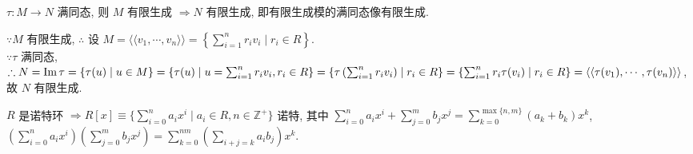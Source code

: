 \documentclass{note}
\begin{document}
\begin{cor}\label{cor for thm-5.8}
    $\tau:M\rightarrow N$ 满同态, 则 $M$ 有限生成 $\Longrightarrow N$ 有限生成, 即有限生成模的满同态像有限生成.
\end{cor}
\begin{pf}
    $\because M$ 有限生成, $\therefore$ 设 $M=\langle\langle v_1,\cdots,v_n\rangle\rangle=\left\{\sum_{i=1}^nr_iv_i\mid r_i\in R\right\}$.\\
    $\because\tau$ 满同态, $\therefore N=\operatorname{Im}\tau=\{\tau(u)\mid u\in M\}=\{\tau(u)\mid u=\sum_{i=1}^nr_iv_i,r_i\in R\}=\left\{\tau\left(\sum_{i=1}^nr_iv_i\right)\mid r_i\in R\right\}=\{\sum_{i=1}^nr_i\tau(v_i)\mid r_i\in R\}=\langle\langle\tau(v_1),\cdots,\tau(v_n)\rangle\rangle$, 故 $N$ 有限生成.
\end{pf}

\begin{thm}
    $R$ 是诺特环 $\Longrightarrow R[x]\equiv\{\sum_{i=0}^na_ix^i\mid a_i\in R,n\in\mathbb{Z}^+\}$ 诺特, 其中 $\sum_{i=0}^na_ix^i+\sum_{j=0}^mb_jx^j=\sum_{k=0}^{\max\{n,m\}}(a_k+b_k)x^k$, $\left(\sum_{i=0}^na_ix^i\right)\left(\sum_{j=0}^mb_jx^j\right)=\sum_{k=0}^{nm}\left(\sum_{i+j=k}a_ib_j\right)x^k$.
\end{thm}
\end{document}

